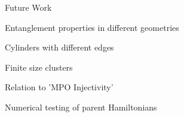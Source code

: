 \begin{frame}{Future Work}
\vskip-1.5cm
\begin{block}{}
	\bi
	\item Entanglement properties in different geometries
		\bi
		\item Cylinders with different edges
		\item Finite size clusters 
		\ei
	\item Relation to 'MPO Injectivity'
	  \bi
	  \item 
	  \ei
	\item Numerical testing of parent Hamiltonians
		\bi
		\item 
		\ei
	\ei
	
\end{block}
\end{frame}